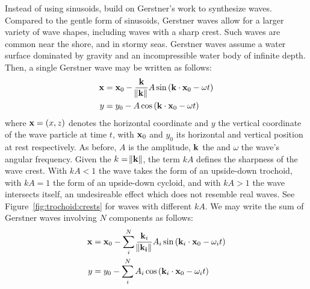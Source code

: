 \textcolor{changed}{Instead of using sinusoids,
\citet{Fournier:1986} build on Gerstner's work \citep{Gerstner:1809, Rankine:1863}
to synthesize waves. Compared to the gentle form of sinusoids, Gerstner
waves allow for a larger variety of wave shapes, including waves with a
sharp crest. Such waves are common near the shore, and in stormy seas.
Gerstner waves assume a water surface dominated by gravity and an incompressible
water body of infinite depth.
} Then, a single Gerstner wave may be written as follows:
\begin{align}
\mathbf{x} &= \mathbf{x}_0 - \frac{\mathbf{k}}{\norm{\mathbf{k}}} A \sin\left(\mathbf{k}\cdot\mathbf{x}_0-\omega t\right)\\
y &= y_0 - A \cos\left(\mathbf{k}\cdot\mathbf{x}_0-\omega t\right)
\end{align}
where $\mathbf{x}=(x,z)$ denotes the horizontal coordinate and $y$ the
vertical coordinate of the wave particle at time $t$, with $\mathbf{x}_0$ and $y_0$ its horizontal
and vertical position at rest respectively. As before, $A$ is the amplitude,
$\mathbf{k}$ the \wavevector and $\omega$ the wave's angular frequency. Given the
\wavenumber $k=\norm{\mathbf{k}}$, the term $kA$ defines the sharpness of the wave
crest. With $kA<1$ the wave takes the form of an upside-down trochoid, with
$kA=1$ the form of an upside-down cycloid, and with $kA>1$ the wave intersects
itself, an undesireable effect which does not resemble real waves.
See Figure~\ref{fig:trochoid:crests} for waves with different $kA$.
We may write the sum of Gerstner waves involving $N$ components as follows:
\begin{align}
\mathbf{x} &= \mathbf{x}_0 - \sum_i^N\frac{\mathbf{k}_i}{\norm{\mathbf{k_i}}} A_i \sin\left(\mathbf{k}_i\cdot\mathbf{x}_0-\omega_i t\right)\\
y &= y_0 - \sum_i^N A_i \cos\left(\mathbf{k}_i\cdot\mathbf{x}_0-\omega_i t\right)
\end{align}
%

